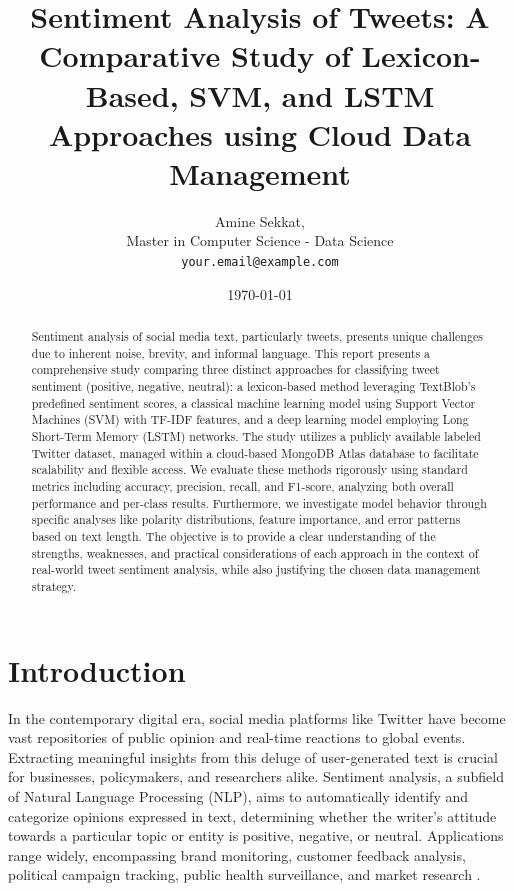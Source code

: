 \documentclass[10pt,twocolumn]{article}
\title{\textbf{Sentiment Analysis of Tweets: A Comparative Study of Lexicon-Based, SVM, and LSTM Approaches using Cloud Data Management}} %
\author{Amine Sekkat,  \\ Master in Computer Science - Data Science \\ %
        \texttt{your.email@example.com}} %
\date{\today} %
\begin{document}
\maketitle
\thispagestyle{empty} %

\begin{abstract}
Sentiment analysis of social media text, particularly tweets, presents unique challenges due to inherent noise, brevity, and informal language. This report presents a comprehensive study comparing three distinct approaches for classifying tweet sentiment (positive, negative, neutral): a lexicon-based method leveraging TextBlob's predefined sentiment scores, a classical machine learning model using Support Vector Machines (SVM) with TF-IDF features, and a deep learning model employing Long Short-Term Memory (LSTM) networks. The study utilizes a publicly available labeled Twitter dataset, managed within a cloud-based MongoDB Atlas database to facilitate scalability and flexible access. We evaluate these methods rigorously using standard metrics including accuracy, precision, recall, and F1-score, analyzing both overall performance and per-class results. Furthermore, we investigate model behavior through specific analyses like polarity distributions, feature importance, and error patterns based on text length. The objective is to provide a clear understanding of the strengths, weaknesses, and practical considerations of each approach in the context of real-world tweet sentiment analysis, while also justifying the chosen data management strategy.
\end{abstract}

\section{Introduction}
\label{sec:introduction}

In the contemporary digital era, social media platforms like Twitter have become vast repositories of public opinion and real-time reactions to global events. Extracting meaningful insights from this deluge of user-generated text is crucial for businesses, policymakers, and researchers alike. Sentiment analysis, a subfield of Natural Language Processing (NLP), aims to automatically identify and categorize opinions expressed in text, determining whether the writer's attitude towards a particular topic or entity is positive, negative, or neutral. Applications range widely, encompassing brand monitoring, customer feedback analysis, political campaign tracking, public health surveillance, and market research \cite{ref:feldman2013}.
\end{document}
